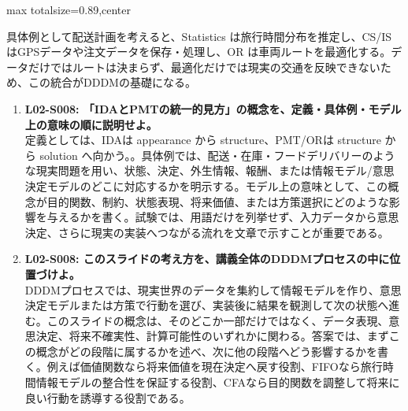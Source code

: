 \begin{minipage}[t]{0.58\textwidth}
\begin{adjustbox}{max totalsize={\textwidth}{0.89\textheight},center}
\begin{minipage}{\textwidth}
具体例として配送計画を考えると、Statistics は旅行時間分布を推定し、CS/IS はGPSデータや注文データを保存・処理し、OR は車両ルートを最適化する。データだけではルートは決まらず、最適化だけでは現実の交通を反映できないため、この統合がDDDMの基礎になる。\par{}\begin{enumerate}\item \textbf{L02-S008: 「IDAとPMTの統一的見方」の概念を、定義・具体例・モデル上の意味の順に説明せよ。}\\定義としては、IDAは appearance から structure、PMT/ORは structure から solution へ向かう。。具体例では、配送・在庫・フードデリバリーのような現実問題を用い、状態、決定、外生情報、報酬、または情報モデル/意思決定モデルのどこに対応するかを明示する。モデル上の意味として、この概念が目的関数、制約、状態表現、将来価値、または方策選択にどのような影響を与えるかを書く。試験では、用語だけを列挙せず、入力データから意思決定、さらに現実の実装へつながる流れを文章で示すことが重要である。\item \textbf{L02-S008: このスライドの考え方を、講義全体のDDDMプロセスの中に位置づけよ。}\\DDDMプロセスでは、現実世界のデータを集約して情報モデルを作り、意思決定モデルまたは方策で行動を選び、実装後に結果を観測して次の状態へ進む。このスライドの概念は、そのどこか一部だけではなく、データ表現、意思決定、将来不確実性、計算可能性のいずれかに関わる。答案では、まずこの概念がどの段階に属するかを述べ、次に他の段階へどう影響するかを書く。例えば価値関数なら将来価値を現在決定へ戻す役割、FIFOなら旅行時間情報モデルの整合性を保証する役割、CFAなら目的関数を調整して将来に良い行動を誘導する役割である。\end{enumerate}
\end{minipage}
\end{adjustbox}
\end{minipage}


